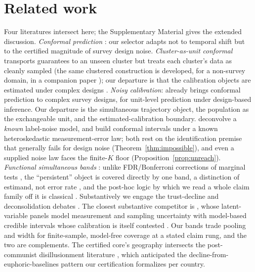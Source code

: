 \section{Related work}\label{sec:related}

Four literatures intersect here; the Supplementary Material gives the extended
discussion. \emph{Conformal prediction}
\citep{vovk2005algorithmic,lei2018distribution,barber2023conformal}: our selector
adapts not to temporal shift \citep{gibbs2021adaptive} but to the certified magnitude
of survey design noise. \emph{Cluster-as-unit conformal}
\citep{dunn2023distribution,lee2023distribution} transports guarantees to an unseen
cluster but treats each cluster's data as cleanly sampled (the same clustered construction is developed, for a non-survey domain, in a
companion paper \citep{park2026poverty}); our departure is that the calibration
objects are estimated under complex designs
\citep{binder1983variances,lumley2010complex}. \emph{Noisy calibration}: \citet{wieczorek2023design} already brings conformal
prediction to complex survey designs, for unit-level prediction under
design-based inference. Our departure is the simultaneous trajectory object, the
population as the exchangeable unit, and the estimated-calibration boundary.
\citet{einbinder2024label,sesia2025adaptive} deconvolve a \emph{known}
label-noise model, and \citet{singer2025conformal} build conformal intervals
under a known heteroskedastic measurement-error law; both rest on the
identification premise that generally fails for design
noise (Theorem~\ref{thm:impossible}), and even a supplied noise law faces the
finite-$K$ floor (Proposition~\ref{prop:unreach}). \emph{Functional simultaneous bands} \citep{diquigiovanni2021conformal}: unlike
FDR/Bonferroni corrections of marginal tests
\citep{benjamini1995controlling}, the ``persistent'' object is covered directly by
one band, a distinction of estimand, not error rate \citep{gelman2012why}, and
the post-hoc logic by which we read a whole claim family off it is classical
\citep{scheffe1953method,marcus1976closed,goeman2011multiple,katsevich2020simultaneous}.
Substantively we engage the trust-decline and
deconsolidation debates \citep{norris2017western,voeten2017people,wuttke2022europeans,valgardsson2025crisis,foa2016democratic,foa2017signs,ouattara2023distrusting,vandermeer2025pushing,kolczynska2026trust}. The closest substantive
competitor is \citet{claassen2019estimating,claassen2020support}, whose
latent-variable panels model measurement and sampling uncertainty with model-based
credible intervals whose calibration is itself contested
\citep{taihusolt2024}. Our bands trade pooling and width for finite-sample,
model-free coverage at a stated claim rung, and the two are complements. The certified core's
geography intersects the post-communist disillusionment literature
\citep{mishler1997trajectories,inglehart2003honeymoon}, which anticipated the
decline-from-euphoric-baselines pattern our certification formalizes per country.
